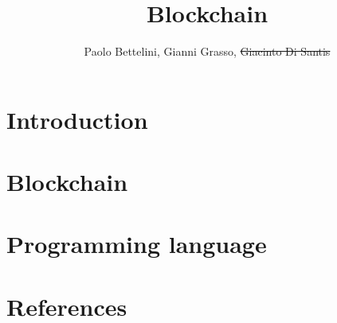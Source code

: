 \documentclass{article}
\title{Blockchain}
\author{Paolo Bettelini, Gianni Grasso, \sout{Giacinto Di Santis}}
\date{}
\begin{document}
\maketitle
\tableofcontents
\pagebreak

\section{Introduction}



\pagebreak

\section{Blockchain}



\pagebreak

\section{Programming language}



\pagebreak

\section{References}


\end{document}
